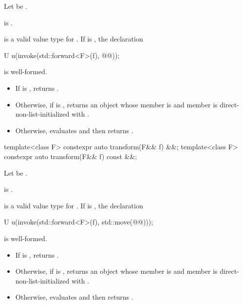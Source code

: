 \begin{itemdescr}
\pnum
Let  be
.

\pnum
\constraints
{} is .

\pnum
\mandates
{} is a valid value type for .
If  is ,
the declaration
\begin{codeblock}
U u(invoke(std::forward<F>(f), @@));
\end{codeblock}
is well-formed.

\pnum
\effects
\begin{itemize}
\item
If  is , returns
.
\item
Otherwise, if  is , returns an
 object whose  member is 
and  member is direct-non-list-initialized with
.
\item
Otherwise, evaluates  and then
returns .
\end{itemize}
\end{itemdescr}

%
\begin{itemdecl}
template<class F> constexpr auto transform(F&& f) &&;
template<class F> constexpr auto transform(F&& f) const &&;
\end{itemdecl}

\begin{itemdescr}
\pnum
Let  be
.

\pnum
\constraints
{} is .

\pnum
\mandates
{} is a valid value type for . If  is
, the declaration
\begin{codeblock}
U u(invoke(std::forward<F>(f), std::move(@@)));
\end{codeblock}
is well-formed.

\pnum
\effects
\begin{itemize}
\item
If  is , returns
.
\item
Otherwise, if  is , returns an
 object whose  member is 
and  member is direct-non-list-initialized with
.
\item
Otherwise, evaluates  and
then returns .
\end{itemize}
\end{itemdescr}

